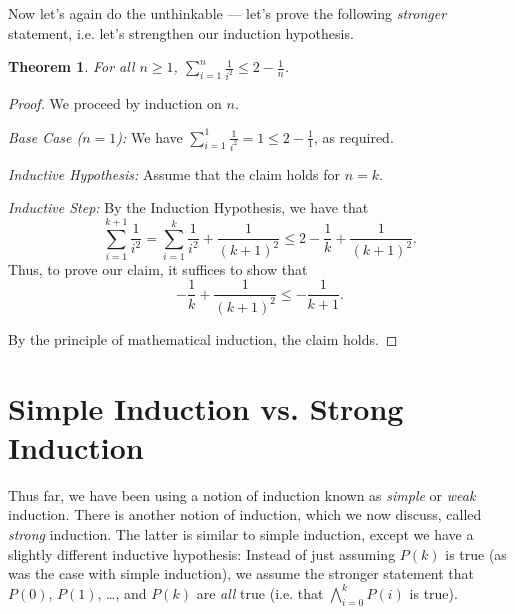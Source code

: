 \documentclass[11pt]{article}
\newcounter{thm}
\newtheorem{theorem}{Theorem}[thm]
\begin{document}
Now let's again do the unthinkable --- let's prove the following \emph{stronger} statement, i.e. let's strengthen our induction hypothesis.

\begin{theorem}\label{thm:sumlessthan2}
    For all $n \geq 1$, $\displaystyle\sum_{i=1}^n \frac{1}{i^2}\leq 2-\frac{1}{n}$.
\end{theorem}
\begin{proof}
We proceed by induction on $n$.

\emph{Base Case ($n = 1$):} We have $\displaystyle\sum_{i=1}^1\frac{1}{i^2}=1\leq 2-\frac{1}{1}$, as required.

\emph{Inductive Hypothesis:} Assume that the claim holds for $n=k$.

\emph{Inductive Step:} By the Induction Hypothesis, we have that
\[
    \sum_{i=1}^{k+1} \frac{1}{i^2}=\sum_{i=1}^{k} \frac{1}{i^2}+ \frac{1}{(k+1)^2}\leq 2-\frac{1}{k} + \frac{1}{(k+1)^2}.
\]
Thus, to prove our claim, it suffices to show that
\begin{equation}\label{eqn:bound}
    -\frac{1}{k} + \frac{1}{(k+1)^2} \leq -\frac{1}{k+1}.
\end{equation}


By the principle of mathematical induction, the claim holds.
\end{proof}



\section{Simple Induction vs. Strong Induction}

Thus far, we have been using a notion of induction known as \emph{simple} or \emph{weak} induction. There is another notion of induction, which we now discuss, called \emph{strong} induction. The latter is similar to simple induction, except we have a slightly different inductive hypothesis: Instead of just assuming $P(k)$ is true (as was the case with simple induction), we assume the stronger statement that $P(0)$, $P(1)$, \ldots, and $P(k)$ are \emph{all} true (i.e. that $\bigwedge_{i=0}^{k} P(i)$ is true).
\end{document}

